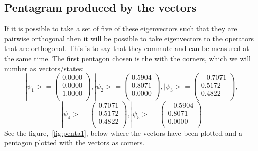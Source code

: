 \subsection{Pentagram produced by the vectors}\label{subsec:Pentagram produced by the vectors}
If it is possible to take a set of five of these eigenvectors such that they are pairwise orthogonal then it will be possible to take eigenvectors to the operators that are orthogonal. This is to say that they commute and can be measured at the same time. The first pentagon chosen is the with the corners, which we will number as vectors/states:\\
\begin{equation*}
|\psi_1>=
\begin{pmatrix}
0.0000\\
0.0000\\
1.0000\\
\end{pmatrix}
,
|\psi_2>=
\begin{pmatrix}
0.5904\\
0.8071\\
0.0000\\
\end{pmatrix}
,
|\psi_3>=
\begin{pmatrix}
-0.7071\\
0.5172\\
0.4822\\
\end{pmatrix}
,
\end{equation*}
\begin{equation*}
|\psi_4>=
\begin{pmatrix}
0.7071\\
0.5172\\
0.4822\\
\end{pmatrix}
,
|\psi_5>=
\begin{pmatrix}
-0.5904\\
0.8071\\
0.0000\\
\end{pmatrix}
\end{equation*}
See the figure,~\ref{fig:penta1}, below where the vectors have been plotted and a pentagon plotted with the vectors as corners.
